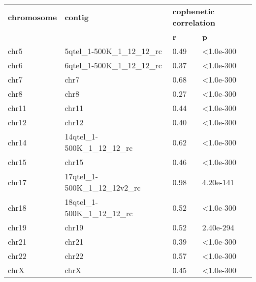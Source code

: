 \begin{samepage} \begin{table}[h!] \small \begin{tabular}{llll}
\hline
\textbf{chromosome}  &  \textbf{contig}                  &  \multicolumn{2}{l}{\textbf{cophenetic correlation}} \\
\textbf{}            &  \textbf{}                        &  \textbf{r}                                              &  \textbf{p} \\
\hline
chr5                 &  5qtel\_1-500K\_1\_12\_12\_rc     &  0.49                                                    &  <1.0e-300 \\
chr6                 &  6qtel\_1-500K\_1\_12\_12\_rc     &  0.37                                                    &  <1.0e-300 \\
chr7                 &  chr7                             &  0.68                                                    &  <1.0e-300 \\
chr8                 &  chr8                             &  0.27                                                    &  <1.0e-300 \\
chr11                &  chr11                            &  0.44                                                    &  <1.0e-300 \\
chr12                &  chr12                            &  0.40                                                    &  <1.0e-300 \\
chr14                &  14qtel\_1-500K\_1\_12\_12\_rc    &  0.62                                                    &  <1.0e-300 \\
chr15                &  chr15                            &  0.46                                                    &  <1.0e-300 \\
chr17                &  17qtel\_1-500K\_1\_12\_12v2\_rc  &  0.98                                                    &  4.20e-141 \\
chr18                &  18qtel\_1-500K\_1\_12\_12\_rc    &  0.52                                                    &  <1.0e-300 \\
chr19                &  chr19                            &  0.52                                                    &  2.40e-294 \\
chr21                &  chr21                            &  0.39                                                    &  <1.0e-300 \\
chr22                &  chr22                            &  0.57                                                    &  <1.0e-300 \\
chrX                 &  chrX                             &  0.45                                                    &  <1.0e-300 \\
\hline
\end{tabular}
\caption{}
\label{}
\end{table}
\end{samepage}
